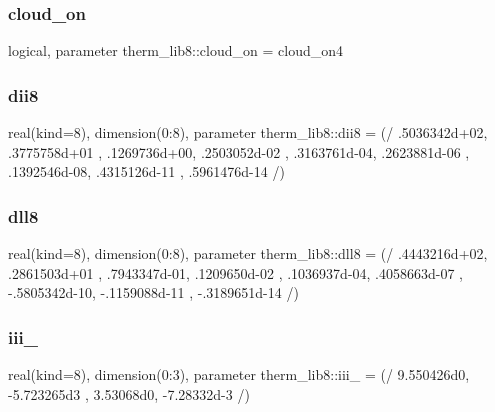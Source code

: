 \subsubsection{\texorpdfstring{cloud\+\_\+on}{cloud\_on}}
{\footnotesize\ttfamily logical, parameter therm\+\_\+lib8\+::cloud\+\_\+on = cloud\+\_\+on4}

\mbox{\label{namespacetherm__lib8_a3bfe64ca1b1761eb7fddc3aa544df182}} 
\subsubsection{\texorpdfstring{dii8}{dii8}}
{\footnotesize\ttfamily real(kind=8), dimension(0\+:8), parameter therm\+\_\+lib8\+::dii8 = (/ .\+5036342d+02, .\+3775758d+01 , .\+1269736d+00, .\+2503052d-\/02 , .\+3163761d-\/04, .\+2623881d-\/06 , .\+1392546d-\/08, .\+4315126d-\/11 , .\+5961476d-\/14 /)}

\mbox{\label{namespacetherm__lib8_adbebbc1cdfb1af05d0cf1f50b2f0df90}} 
\subsubsection{\texorpdfstring{dll8}{dll8}}
{\footnotesize\ttfamily real(kind=8), dimension(0\+:8), parameter therm\+\_\+lib8\+::dll8 = (/ .\+4443216d+02, .\+2861503d+01 , .\+7943347d-\/01, .\+1209650d-\/02 , .\+1036937d-\/04, .\+4058663d-\/07 , -\/.\+5805342d-\/10, -\/.\+1159088d-\/11 , -\/.\+3189651d-\/14 /)}

\mbox{\label{namespacetherm__lib8_ae4acd61a7c0e6a8e640771554e879769}} 
\subsubsection{\texorpdfstring{iii\+\_}{iii\_78}}
{\footnotesize\ttfamily real(kind=8), dimension(0\+:3), parameter therm\+\_\+lib8\+::iii\+\_ = (/ 9.\+550426d0, -\/5.\+723265d3 , 3.\+53068d0, -\/7.\+28332d-\/3 /)}

\mbox{\label{namespacetherm__lib8_a2874cfd6a2661d95f8a2b827ebbd1d5d}} 
